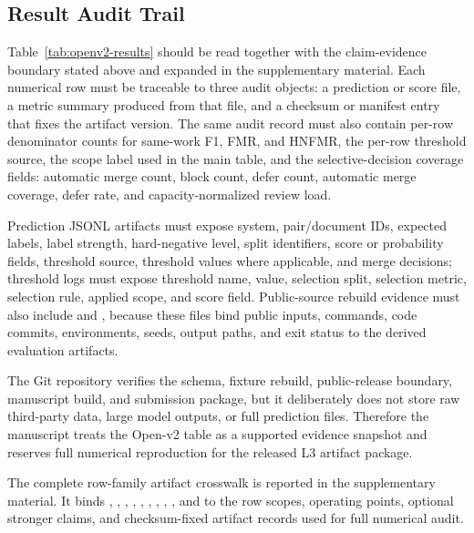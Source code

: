 \documentclass[11pt]{article}
\begin{document}
\subsection{Result Audit Trail}

Table~\ref{tab:openv2-results} should be read together with the claim-evidence boundary stated above and expanded in the supplementary material. Each numerical row must be traceable to three audit objects: a prediction or score file, a metric summary produced from that file, and a checksum or manifest entry that fixes the artifact version. The same audit record must also contain per-row denominator counts for same-work F1, FMR, and HNFMR, the per-row threshold source, the scope label used in the main table, and the selective-decision coverage fields: automatic merge count, block count, defer count, automatic merge coverage, defer rate, and capacity-normalized review load.

Prediction JSONL artifacts must expose system, pair/document IDs, expected labels, label strength, hard-negative level, split identifiers, score or probability fields, threshold source, threshold values where applicable, and merge decisions; threshold logs must expose threshold name, value, selection split, selection metric, selection rule, applied scope, and score field. Public-source rebuild evidence must also include  and , because these files bind public inputs, commands, code commits, environments, seeds, output paths, and exit status to the derived evaluation artifacts.

The Git repository verifies the schema, fixture rebuild, public-release boundary, manuscript build, and submission package, but it deliberately does not store raw third-party data, large model outputs, or full prediction files. Therefore the manuscript treats the Open-v2 table as a supported evidence snapshot and reserves full numerical reproduction for the released L3 artifact package.

The complete row-family artifact crosswalk is reported in the supplementary material. It binds , , , , , , , , , and  to the row scopes, operating points, optional stronger claims, and checksum-fixed artifact records used for full numerical audit.
\end{document}
